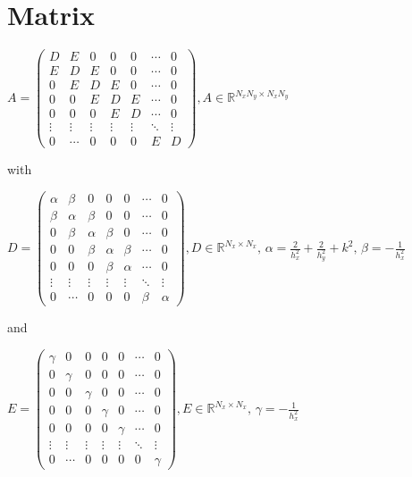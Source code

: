 \section{Matrix}

$A =
 \left. \begin{pmatrix}
  	D 		& E 		& 0 		& 0 		& 0 		& \cdots 		& 0 \\
  	E 		& D 		& E 		& 0 		& 0 		& \cdots 		& 0 \\
	0 		& E 		& D 		& E 		& 0 		& \cdots 		& 0 \\
	0 		& 0 		& E 		& D 		& E 		& \cdots 		& 0 \\
	0 		& 0 		& 0 		& E 		& D 		& \cdots 		& 0 \\
  	\vdots  	& \vdots  	& \vdots 	& \vdots 	& \vdots  	& \ddots 		& \vdots\\
  	0 		& \cdots 	& 0 		& 0 		& 0		& E 			& D
 \end{pmatrix}
\right. \text{$, A \in \mathbb{R}^{N_{x}N_{y} \times N_{x}N_{y}}$}$

with \newline
\newline

$D =
\left. \begin{pmatrix}
	\alpha		& \beta	& 0 		& 0 		& 0 		& \cdots 		& 0 \\
  	\beta 		& \alpha	& \beta	& 0 		& 0 		& \cdots 		& 0 \\
	0 		& \beta	& \alpha	& \beta	& 0 		& \cdots 		& 0 \\
	0 		& 0 		& \beta	& \alpha	& \beta	& \cdots 		& 0 \\
	0 		& 0 		& 0 		& \beta	& \alpha	& \cdots 		& 0 \\
  	\vdots  	& \vdots  	& \vdots 	& \vdots 	& \vdots  	& \ddots 		& \vdots\\
  	0 		& \cdots 	& 0 		& 0 		& 0		& \beta		& \alpha
\end{pmatrix}
\right. \text{$, D \in \mathbb{R}^{N_{x} \times N_{x}}$, $\alpha = \frac{2}{h_{x}^{2}} + \frac{2}{h_{y}^{2}} + k^{2}$, $\beta = - \frac{1}{h_{x}^{2}}$}$

and\newline
\newline

$E =
\left. \begin{pmatrix}
	\gamma	& 0		& 0 		& 0 		& 0 		& \cdots 		& 0 \\
  	0		& \gamma	& 0 		& 0 		& 0 		& \cdots 		& 0 \\
	0 		& 0 		& \gamma	& 0		& 0 		& \cdots 		& 0 \\
	0 		& 0 		& 0 		& \gamma	& 0 		& \cdots 		& 0 \\
	0 		& 0 		& 0 		& 0 		& \gamma	& \cdots 		& 0 \\
  	\vdots  	& \vdots  	& \vdots 	& \vdots 	& \vdots  	& \ddots 		& \vdots\\
  	0 		& \cdots 	& 0 		& 0 		& 0		& 0 			& \gamma
\end{pmatrix}
\right. \text{$, E \in \mathbb{R}^{N_{x} \times N_{x}}$, $\gamma = - \frac{1}{h_{x}^{2}}$}$
